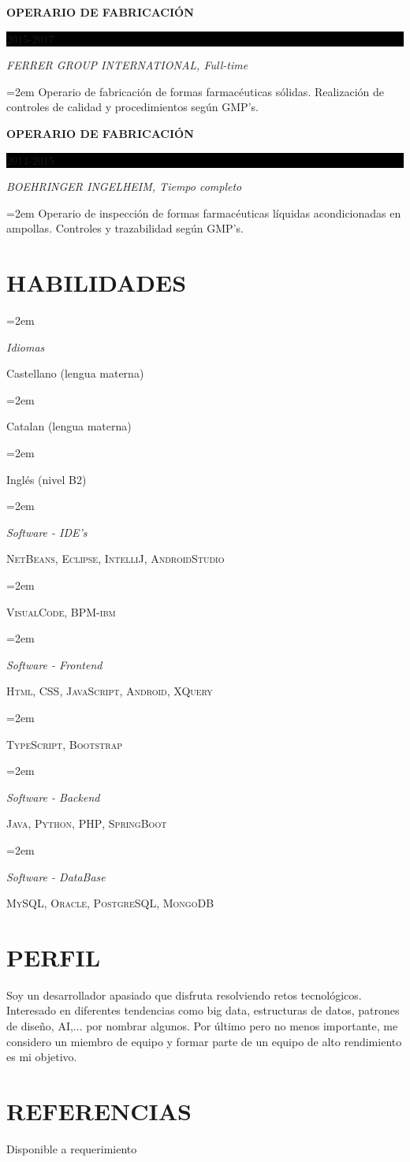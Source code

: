 \documentclass[paper=a4,fontsize=11pt]{scrartcl} %
\newlength{\spacebox}
\newcommand{\sepspace}{\vspace*{1em}}		%
\newcommand{\NewPart}[1]{\section*{\uppercase{#1}}}
\newcommand{\PersonalEntry}[2]{
		\noindent\hangindent=2em\hangafter=0 %
		\parbox{\spacebox}{        %
		\textit{#1}}		       %
		\hspace{1.5em} #2 \par}    %
\newcommand{\SkillsEntry}[2]{      %
		\noindent\hangindent=2em\hangafter=0 %
		\parbox{\spacebox}{        %
		\textit{#1}}			   %
		\hspace{1.5em} #2 \par}    %
\newcommand{\EducationEntry}[4]{
		\noindent \textbf{#1} \hfill      %
		\colorbox{Black}{%
			\parbox{6em}{%
			\hfill\color{White}#2}} \par  %
		\noindent \textit{#3} \par        %
		\noindent\hangindent=2em\hangafter=0 \small #4 %
		\normalsize \par}
\begin{document}
\EducationEntry{OPERARIO DE FABRICACIÓN}{2015-2017}{FERRER GROUP INTERNATIONAL, Full-time}{Operario de fabricación de formas farmacéuticas sólidas. Realización de controles de calidad y procedimientos según GMP’s.}
\sepspace

\EducationEntry{OPERARIO DE FABRICACIÓN}{2014-2015}{BOEHRINGER INGELHEIM, Tiempo completo}{Operario de inspección de formas farmacéuticas líquidas acondicionadas en ampollas. Controles y trazabilidad según GMP’s.}
\sepspace

\NewPart{Habilidades}{}

\SkillsEntry{Idiomas}{Castellano (lengua materna)}
\SkillsEntry{}{Catalan (lengua materna)}
\SkillsEntry{}{Inglés (nivel B2)}
\sepspace

\SkillsEntry{Software - IDE's}{\textsc{NetBeans}, \textsc{Eclipse}, \textsc{IntelliJ}, \textsc{AndroidStudio}}
\SkillsEntry{}{\textsc{VisualCode}, \textsc{BPM-ibm}}
\sepspace

\SkillsEntry{Software - Frontend}{\textsc{Html}, \textsc{CSS}, \textsc{JavaScript}, \textsc{Android}, \textsc{XQuery}}
\SkillsEntry{}{\textsc{TypeScript}, \textsc{Bootstrap}}
\sepspace

\SkillsEntry{Software - Backend}{\textsc{Java}, \textsc{Python}, \textsc{PHP}, \textsc{SpringBoot}}
\sepspace

\SkillsEntry{Software - DataBase}{\textsc{MySQL, Oracle, PostgreSQL, MongoDB}}
\sepspace

\NewPart{Perfil}{}
Soy un desarrollador apasiado que disfruta resolviendo retos tecnológicos. Interesado en diferentes tendencias como big data, estructuras de datos, patrones de diseño, AI,... por nombrar algunos. Por último pero no menos importante, me considero un miembro de equipo y formar parte de un equipo de alto rendimiento es mi objetivo.



\NewPart{Referencias}{}
Disponible a requerimiento
\end{document}

